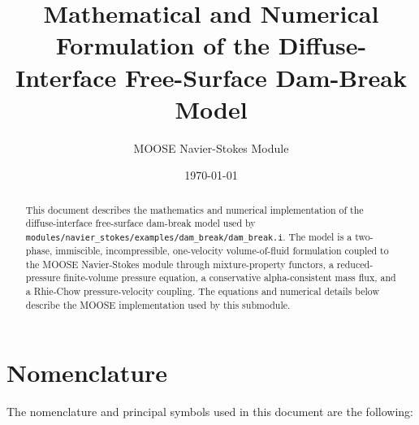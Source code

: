 \documentclass[11pt]{article}
\title{Mathematical and Numerical Formulation of the Diffuse-Interface Free-Surface Dam-Break Model}
\author{MOOSE Navier-Stokes Module}
\date{\today}
\begin{document}
\maketitle

\begin{abstract}
This document describes the mathematics and numerical implementation of the
diffuse-interface free-surface dam-break model used by
\texttt{modules/navier\_stokes/examples/dam\_break/dam\_break.i}.  The model is a two-phase,
immiscible, incompressible, one-velocity volume-of-fluid formulation coupled to
the MOOSE Navier-Stokes module through mixture-property functors, a
reduced-pressure finite-volume pressure equation, a conservative
alpha-consistent mass flux, and a Rhie-Chow pressure-velocity coupling.  The
equations and numerical details below describe the MOOSE implementation used
by this submodule.
\end{abstract}

\tableofcontents

\section{Nomenclature}

The nomenclature and principal symbols used in this document are the following:
\end{document}
